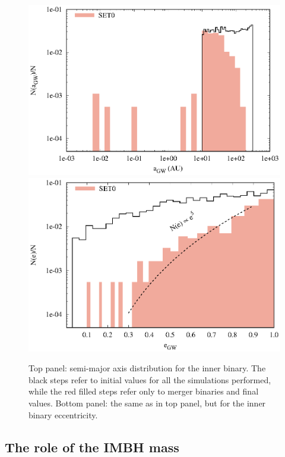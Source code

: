 \documentclass[twocolumn]{aastex62}
\begin{document}
\begin{figure}
\centering
\includegraphics[width=\columnwidth]{semiaxis}\\
\includegraphics[width=\columnwidth]{ecce}
\caption{Top panel: semi-major axis distribution for the inner binary. The black steps refer to initial values for all the simulations performed, while the red filled steps refer only to merger binaries and final values. Bottom panel: the same as in top panel, but for the inner binary eccentricity.}
\label{fig:f4}
\end{figure}

\subsection{The role of the IMBH mass}
\end{document}
